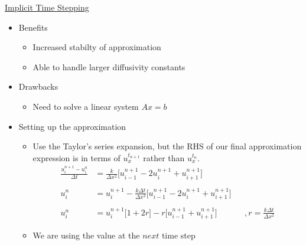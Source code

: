 \documentclass[compress]{beamer}
\begin{document}
\begin{frame}
\begin{center}
\underline{Implicit Time Stepping}
\end{center}
\begin{itemize}
\item Benefits
\begin{itemize}
\item Increased stabilty of approximation
\item Able to handle larger diffusivity constants
\end{itemize}
\item Drawbacks
\begin{itemize}
\item Need to solve a linear system  $Ax=b$
\end{itemize}
\end{itemize}
\end{frame}

\begin{frame}
\begin{itemize}
\item Setting up the approximation
\begin{itemize}
\item Use the Taylor's series expansion, but the RHS of our final approximation expression is in terms of $u_x^{t_{n+1}}$ rather than $u_x^{t_{n}}$. 
\begin{align*}
\frac{u_i^{n+1}-u_i^n}{\Delta t}	&=\frac{k}{\Delta x^2}\Big[u_{i-1}^{n+1}-2u_i^{n+1}+u_{i+1}^{n+1}\Big]	\\
									&																			\\
u_i^n								&=u_i^{n+1}-\frac{k\Delta t}{\Delta x^2}\Big[u_{i-1}^{n+1}-2u_i^{n+1}+u_{i+1}^{n+1}\Big] 	\\
									&																			\\
u_i^n								&=u_i^{n+1}\Big[1+2r\Big]-r\Big[u_{i-1}^{n+1}+u_{i+1}^{n+1}\Big]			&&,r=\frac{k\Delta t}{\Delta x^2}						
\end{align*}
\item We are using the value at the $next$ time step
\end{itemize}
\end{itemize}
\end{frame}
\end{document}

